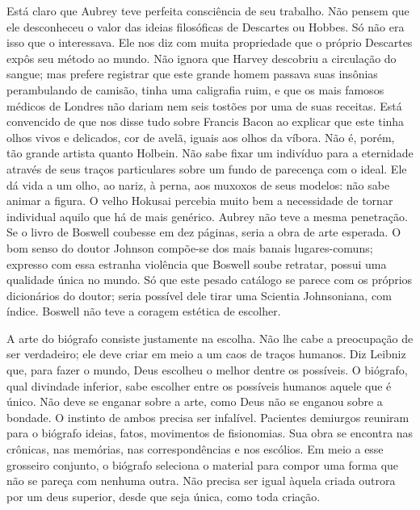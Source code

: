 Está claro que Aubrey teve perfeita consciência de seu trabalho. Não pensem
que ele desconheceu o valor das ideias filosóficas de Descartes ou Hobbes.
Só não era isso que o interessava. Ele nos diz com muita propriedade que o
próprio Descartes expôs seu método ao mundo. Não ignora que Harvey
descobriu a circulação do sangue; mas prefere registrar que este grande
homem passava suas insônias perambulando de camisão, tinha uma caligrafia
ruim, e que os mais famosos médicos de Londres não dariam nem seis tostões
por uma de suas receitas. Está convencido de que nos disse tudo sobre
Francis Bacon ao explicar que este tinha olhos vivos e delicados, cor de
avelã, iguais aos olhos da víbora. Não é, porém, tão grande artista quanto
Holbein. Não sabe fixar um indivíduo para a eternidade através de seus
traços particulares sobre um fundo de parecença com o ideal. Ele dá vida a
um olho, ao nariz, à perna, aos muxoxos de seus modelos: não sabe animar a
figura. O velho Hokusai percebia muito bem a necessidade de tornar
individual aquilo que há de mais genérico. Aubrey não teve a mesma
penetração. Se o livro de Boswell coubesse em dez páginas, seria a obra de
arte esperada. O bom senso do doutor Johnson compõe-se dos mais banais
lugares-comuns; expresso com essa estranha violência que Boswell soube
retratar, possui uma qualidade única no mundo. Só que este pesado catálogo
se parece com os próprios dicionários do doutor; seria possível dele tirar
uma Scientia Johnsoniana, com índice. Boswell não teve a coragem estética de escolher.

A arte do biógrafo consiste justamente na escolha. Não lhe cabe a
preocupação de ser verdadeiro; ele deve criar em meio a um caos de traços
humanos. Diz Leibniz que, para fazer o mundo, Deus escolheu o melhor
dentre os possíveis. O biógrafo, qual divindade inferior, sabe escolher
entre os possíveis humanos aquele que é único. Não deve se enganar sobre a
arte, como Deus não se enganou sobre a bondade. O instinto de ambos
precisa ser infalível. Pacientes demiurgos reuniram para o biógrafo
ideias, fatos, movimentos de fisionomias. Sua obra se encontra nas
crônicas, nas memórias, nas correspondências e nos escólios. Em meio a
esse grosseiro conjunto, o biógrafo seleciona o material para compor uma
forma que não se pareça com nenhuma outra. Não precisa ser igual àquela
criada outrora por um deus superior, desde que seja única, como toda criação.

